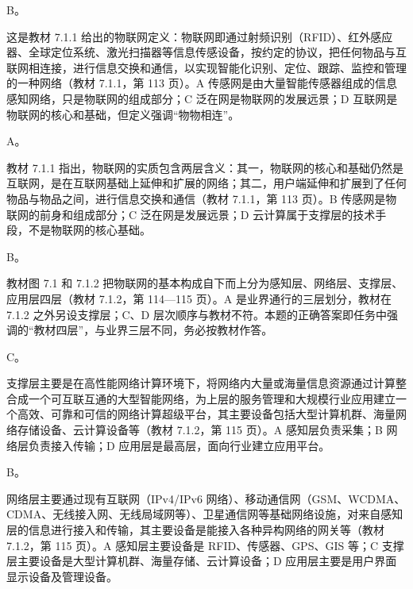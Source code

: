 \documentclass[a4paper,11pt]{article}
\begin{document}


\q B。\begin{analysis}这是教材 7.1.1 给出的物联网定义：物联网即通过射频识别（RFID）、红外感应器、全球定位系统、激光扫描器等信息传感设备，按约定的协议，把任何物品与互联网相连接，进行信息交换和通信，以实现智能化识别、定位、跟踪、监控和管理的一种网络（教材 7.1.1，第 113 页）。A 传感网是由大量智能传感器组成的信息感知网络，只是物联网的组成部分；C 泛在网是物联网的发展远景；D 互联网是物联网的核心和基础，但定义强调“物物相连”。\end{analysis}

\q A。\begin{analysis}教材 7.1.1 指出，物联网的实质包含两层含义：其一，物联网的核心和基础仍然是互联网，是在互联网基础上延伸和扩展的网络；其二，用户端延伸和扩展到了任何物品与物品之间，进行信息交换和通信（教材 7.1.1，第 113 页）。B 传感网是物联网的前身和组成部分；C 泛在网是发展远景；D 云计算属于支撑层的技术手段，不是物联网的核心基础。\end{analysis}

\q B。\begin{analysis}教材图 7.1 和 7.1.2 把物联网的基本构成自下而上分为感知层、网络层、支撑层、应用层四层（教材 7.1.2，第 114—115 页）。A 是业界通行的三层划分，教材在 7.1.2 之外另设支撑层；C、D 层次顺序与教材不符。本题的正确答案即任务中强调的“教材四层”，与业界三层不同，务必按教材作答。\end{analysis}

\q C。\begin{analysis}支撑层主要是在高性能网络计算环境下，将网络内大量或海量信息资源通过计算整合成一个可互联互通的大型智能网络，为上层的服务管理和大规模行业应用建立一个高效、可靠和可信的网络计算超级平台，其主要设备包括大型计算机群、海量网络存储设备、云计算设备等（教材 7.1.2，第 115 页）。A 感知层负责采集；B 网络层负责接入传输；D 应用层是最高层，面向行业建立应用平台。\end{analysis}

\q B。\begin{analysis}网络层主要通过现有互联网（IPv4/IPv6 网络）、移动通信网（GSM、WCDMA、CDMA、无线接入网、无线局域网等）、卫星通信网等基础网络设施，对来自感知层的信息进行接入和传输，其主要设备是能接入各种异构网络的网关等（教材 7.1.2，第 115 页）。A 感知层主要设备是 RFID、传感器、GPS、GIS 等；C 支撑层主要设备是大型计算机群、海量存储、云计算设备；D 应用层主要是用户界面显示设备及管理设备。\end{analysis}
\end{document}
